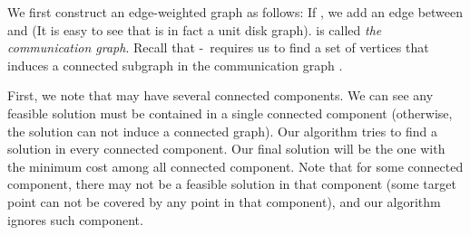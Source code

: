 \documentclass[11pt]{article}
\newcommand{\mincsc}{-}
\begin{document}
We first construct an edge-weighted graph  as follows:
If , we add an edge between  and 
(It is easy to see that  is in fact a unit disk graph).
 is called {\em  the communication graph}.
Recall that \mincsc\ requires us to find a set of vertices
that induces a connected subgraph in the communication graph .

First, we note that  may have several connected components.
We can see any feasible solution must be contained in a single connected component
(otherwise, the solution can not induce a connected graph).
Our algorithm tries to find a solution in every connected component.
Our final solution will be the one with the minimum cost among all connected component.
Note that for some connected component, there may not be a feasible solution
in that component (some target point can not be covered by any point in that component),
and our algorithm ignores such component.
\end{document}
